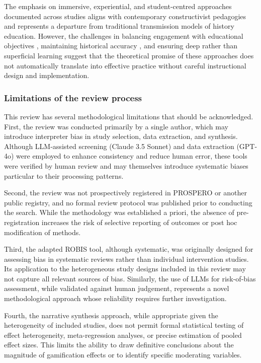 \documentclass[a4paper,fleqn]{cas-sc}
\begin{document}
The emphasis on immersive, experiential, and student-centred approaches documented across studies aligns with contemporary constructivist pedagogies and represents a departure from traditional transmission models of history education. However, the challenges in balancing engagement with educational objectives \citep{71lynch2015pedagogical}, maintaining historical accuracy \citep{1Barbatsis201159, 2Mahamarowi2023133, 25Repantis2011502, 71lynch2015pedagogical, 72hutauruk2020utilization}, and ensuring deep rather than superficial learning suggest that the theoretical promise of these approaches does not automatically translate into effective practice without careful instructional design and implementation.

\subsubsection{Limitations of the review process}

This review has several methodological limitations that should be acknowledged. First, the review was conducted primarily by a single author, which may introduce interpreter bias in study selection, data extraction, and synthesis. Although LLM-assisted screening (Claude 3.5 Sonnet) and data extraction (GPT-4o) were employed to enhance consistency and reduce human error, these tools were verified by human review and may themselves introduce systematic biases particular to their processing patterns.

Second, the review was not prospectively registered in PROSPERO or another public registry, and no formal review protocol was published prior to conducting the search. While the methodology was established a priori, the absence of pre-registration increases the risk of selective reporting of outcomes or post hoc modification of methods.

Third, the adapted ROBIS tool, although systematic, was originally designed for assessing bias in systematic reviews rather than individual intervention studies. Its application to the heterogeneous study designs included in this review may not capture all relevant sources of bias. Similarly, the use of LLMs for risk-of-bias assessment, while validated against human judgement, represents a novel methodological approach whose reliability requires further investigation.

Fourth, the narrative synthesis approach, while appropriate given the heterogeneity of included studies, does not permit formal statistical testing of effect heterogeneity, meta-regression analyses, or precise estimation of pooled effect sizes. This limits the ability to draw definitive conclusions about the magnitude of gamification effects or to identify specific moderating variables.
\end{document}
